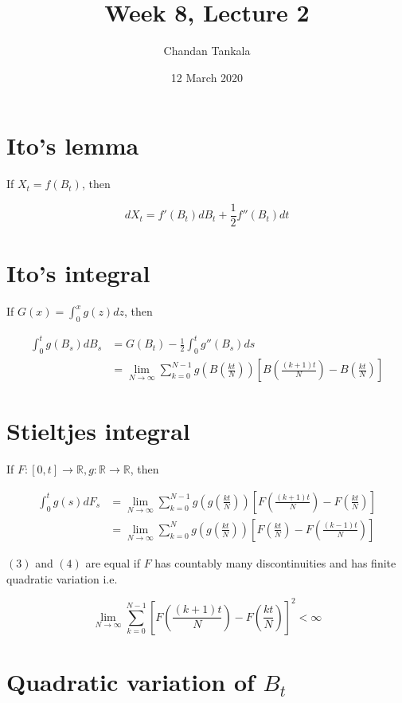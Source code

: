 \documentclass{article}
\title{Week 8, Lecture 2}
\author{Chandan Tankala}
\date{12 March 2020}
\begin{document}
\maketitle
\section{Ito's lemma}
If $X_t = f(B_t)$, then

$$dX_t = f'(B_t)dB_t+\frac{1}{2}f''(B_t)dt$$

\section{Ito's integral}

If $G(x) = \int_0^x g(z)dz$, then

\begin{align}
    \int_0^tg(B_s)dB_s &= G(B_t) -\frac{1}{2}\int_0^t g''(B_s)ds \\
    &= \lim_{N\to \infty} \sum_{k=0}^{N-1}g\left( B\left(\frac{kt}{N} \right) \right)\left[ B\left(\frac{(k+1)t}{N} \right) - B\left(\frac{kt}{N} \right) \right] 
\end{align}


\section{Stieltjes integral}

If $F:[0,t]\to \mathbb{R}, g:\mathbb{R}\to \mathbb{R}$, then

\begin{align}
    \int_0^tg(s)dF_s &= \lim_{N\to \infty} \sum_{k=0}^{N-1}g\left( g\left(\frac{kt}{N} \right) \right)\left[ F\left(\frac{(k+1)t}{N} \right) - F\left(\frac{kt}{N} \right) \right] \\
    &= \lim_{N\to \infty} \sum_{k=0}^{N}g\left( g\left(\frac{kt}{N} \right) \right)\left[ F\left(\frac{kt}{N} \right) - F\left(\frac{(k-1)t}{N} \right) \right]
\end{align}

$(3)$ and $(4)$ are equal if $F$ has countably many discontinuities and has finite quadratic variation i.e. 

$$\lim_{N\to \infty} \sum_{k=0}^{N-1}\left[ F\left( \frac{(k+1)t}{N} \right) - F\left( \frac{kt}{N} \right) \right]^2 < \infty$$

\section{Quadratic variation of $B_t$}
\end{document}

